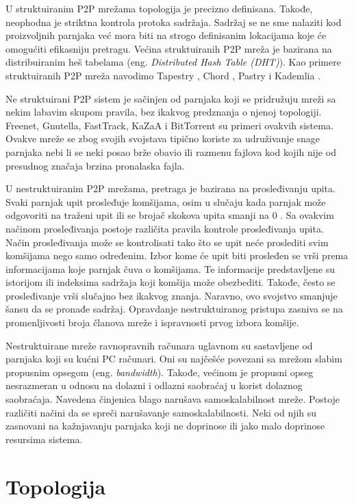 \documentclass[12pt,oneside]{memoir}
\begin{document}
U struktuiranim P2P mrežama topologija je precizno definisana. 
Takođe, neophodna je striktna kontrola protoka sadržaja. Sadržaj se ne sme nalaziti kod proizvoljnih parnjaka već mora biti na strogo definisanim lokacijama koje će omogućiti efikasniju pretragu.
Većina struktuiranih P2P mreža je bazirana na distribuiranim heš tabelama (eng. \textit{Distributed Hash Table (DHT)}). Kao primere struktuiranih P2P mreža navodimo Tapestry \cite{Zhao_2004}, Chord \cite{Stoica_2003}, Pastry \cite{Rowstron_2001} i Kademlia \cite{Maymounkov_2002}.

Ne struktuirani P2P sistem je sačinjen od parnjaka koji se pridružuju mreži sa nekim labavim skupom pravila, bez ikakvog predznanja o njenoj topologiji. Freenet, Gnutella, FastTrack, KaZaA i BitTorrent su primeri ovakvih sistema. Ovakve mreže se zbog svojih svojstava tipično koriste za udruživanje snage parnjaka nebi li se neki posao brže obavio ili razmenu fajlova kod kojih nije od presudnog značaja brzina pronalaska fajla. 

U nestruktuiranim P2P mrežama, pretraga je bazirana na prosleđivanju upita. Svaki parnjak upit prosleđuje komšijama, osim u slučaju kada parnjak može odgovoriti na traženi upit ili se brojač skokova upita smanji na 0 \cite{Shen:2009}. Sa ovakvim načinom prosleđivanja postoje različita pravila kontrole prosleđivanja upita. Način prosleđivanja može se kontrolisati tako što se upit neće proslediti svim komšijama nego samo određenim. Izbor kome će upit biti prosleđen se vrši prema informacijama koje parnjak čuva o komšijama. Te informacije predstavljene su istorijom ili indeksima sadržaja koji komšija može obezbediti. Takođe, često se prosleđivanje vrši slučajno bez ikakvog znanja. Naravno, ovo svojstvo smanjuje šansu da se pronađe sadržaj. 
Opravdanje nestruktuiranog pristupa zasniva se na promenljivosti broja članova mreže i ispravnosti prvog izbora komšije.

Nestruktuirane mreže ravnopravnih računara uglavnom su sastavljene od parnjaka koji su kućni PC računari. Oni su najčešće povezani sa mrežom slabim propusnim opsegom (eng. \textit{bandwidth}). Takođe, većinom je propusni opseg nesrazmeran u odnosu na dolazni i odlazni saobraćaj u korist dolaznog saobraćaja. Navedena činjenica blago narušava samoskalabilnost mreže. Postoje različiti načini da se spreči narušavanje samoskalabilnosti. Neki od njih su zasnovani na kažnjavanju parnjaka koji ne doprinose ili jako malo doprinose resursima sistema. 


\section{Topologija}
\label{P2P.3}
\end{document}

